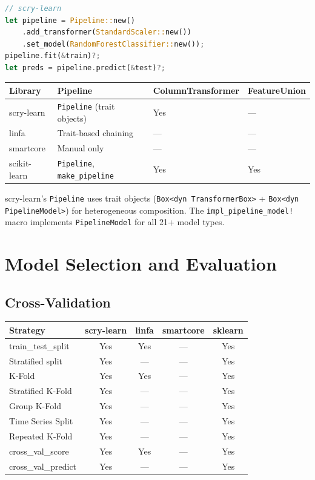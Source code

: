 \documentclass[11pt,a4paper]{article}
\begin{document}
\begin{lstlisting}[language=Rust]
// scry-learn
let pipeline = Pipeline::new()
    .add_transformer(StandardScaler::new())
    .set_model(RandomForestClassifier::new());
pipeline.fit(&train)?;
let preds = pipeline.predict(&test)?;
\end{lstlisting}

\begin{center}
\begin{tabular}{llll}
\toprule
\textbf{Library} & \textbf{Pipeline} & \textbf{ColumnTransformer} & \textbf{FeatureUnion} \\
\midrule
scry-learn & \texttt{Pipeline} (trait objects) & Yes & --- \\
linfa & Trait-based chaining & --- & --- \\
smartcore & Manual only & --- & --- \\
scikit-learn & \texttt{Pipeline}, \texttt{make\_pipeline} & Yes & Yes \\
\bottomrule
\end{tabular}
\end{center}

scry-learn's \texttt{Pipeline} uses trait objects (\texttt{Box<dyn TransformerBox>} + \texttt{Box<dyn PipelineModel>}) for heterogeneous composition. The \texttt{impl\_pipeline\_model!} macro implements \texttt{PipelineModel} for all 21+ model types.


\section{Model Selection and Evaluation}

\subsection{Cross-Validation}

{\small
\begin{center}
\begin{tabular}{lcccc}
\toprule
\textbf{Strategy} & \textbf{scry-learn} & \textbf{linfa} & \textbf{smartcore} & \textbf{sklearn} \\
\midrule
train\_test\_split & Yes & Yes & --- & Yes \\
Stratified split & Yes & --- & --- & Yes \\
K-Fold & Yes & Yes & --- & Yes \\
Stratified K-Fold & Yes & --- & --- & Yes \\
Group K-Fold & Yes & --- & --- & Yes \\
Time Series Split & Yes & --- & --- & Yes \\
Repeated K-Fold & Yes & --- & --- & Yes \\
cross\_val\_score & Yes & Yes & --- & Yes \\
cross\_val\_predict & Yes & --- & --- & Yes \\
\bottomrule
\end{tabular}
\end{center}
}
\end{document}
